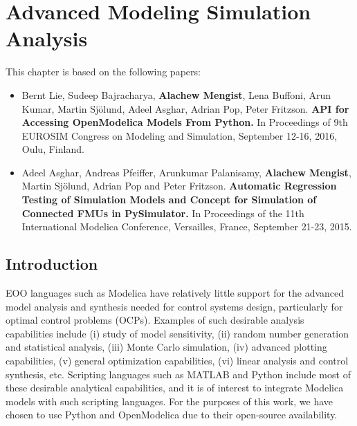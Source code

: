 

\chapter{Advanced Modeling Simulation Analysis}
\label{cha:python}


This chapter is based on the following papers:

\begin{itemize}
		
	\item Bernt Lie, Sudeep Bajracharya, \textbf{Alachew Mengist}, Lena Buffoni, Arun Kumar, Martin Sj\"{o}lund, Adeel Asghar, Adrian Pop, Peter Fritzson.\textbf{ API for Accessing OpenModelica Models From Python.} In Proceedings of 9th EUROSIM Congress on Modeling and Simulation, September 12-16, 2016, Oulu, Finland. 
	
	\item Adeel Asghar, Andreas Pfeiffer, Arunkumar Palanisamy, \textbf{Alachew Mengist}, Martin Sj\"{o}lund, Adrian Pop and Peter Fritzson.\textbf{ Automatic Regression Testing of Simulation Models and Concept for Simulation of Connected FMUs in PySimulator.} In Proceedings of the 11th International Modelica Conference, Versailles, France, September 21-23, 2015. 
		
\end{itemize}

\section{Introduction}
\label{sec:pythonintroduction}

EOO languages such as Modelica have relatively little support for the advanced model analysis and synthesis needed for control systems design, particularly for optimal control problems (OCPs). Examples of such desirable analysis capabilities include (i) study of model sensitivity, (ii) random number generation and statistical analysis, (iii) Monte Carlo simulation, (iv) advanced plotting capabilities, (v) general optimization capabilities, (vi) linear analysis and control synthesis, etc. Scripting languages such as MATLAB and Python include most of these desirable analytical capabilities, and it is of interest to integrate Modelica models with such scripting languages. For the purposes of this work, we have chosen to use Python and OpenModelica due to their open-source availability.

